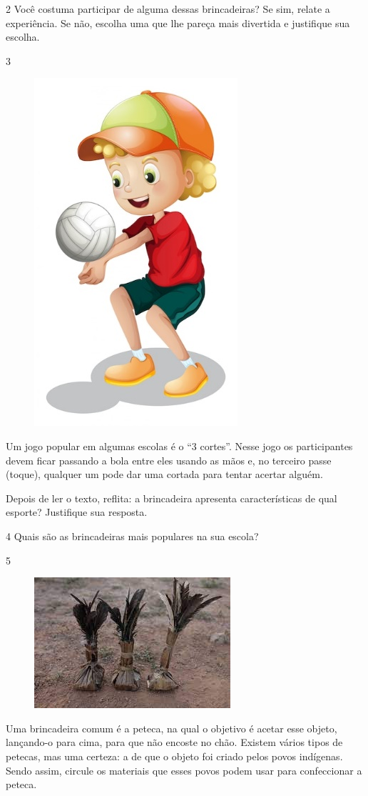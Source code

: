 \num{2} Você costuma participar de alguma dessas brincadeiras? Se sim, relate a experiência. Se não, escolha uma que lhe pareça mais divertida e justifique sua escolha.


\num{3} \begingroup
\begin{figure}
\includegraphics[width=.12\textwidth]{./imgs/img8.jpg}
\end{figure}

Um jogo popular em algumas escolas é o “3 cortes”. Nesse jogo os
  participantes devem ficar passando a bola entre eles usando as mãos e,
  no terceiro passe (toque), qualquer um pode dar uma cortada para tentar
  acertar alguém.

Depois de ler o texto, reflita: a brincadeira apresenta características de qual
esporte? Justifique sua resposta.

\endgroup\bigskip



\num{4} Quais são as brincadeiras mais populares na sua escola?


\num{5}
\begin{figure}
\includegraphics[width=.2\textwidth]{./imgs/img9.jpg}
\end{figure}
Uma brincadeira comum é a peteca, na qual o objetivo é acetar esse objeto, lançando-o para cima,
  para que não encoste no chão. Existem vários tipos de petecas, mas uma certeza: a de que o objeto foi
  criado pelos povos indígenas. Sendo assim, circule os materiais que
  esses povos podem usar para confeccionar a peteca.

